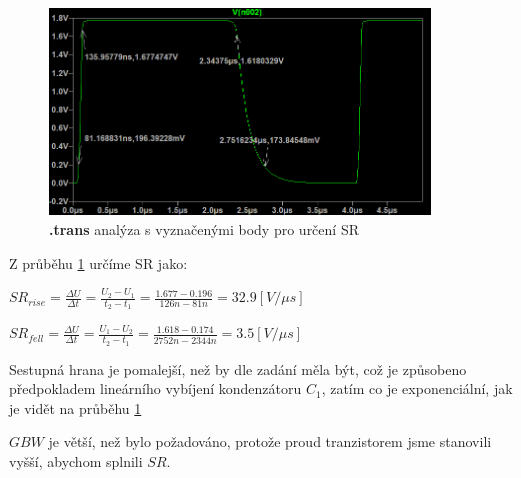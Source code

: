 \vspace{10mm}
\begin{figure}[h!]
    \centering
    \includegraphics[width=0.9\textwidth]{text/img/Res-trans-graf.png}
    \caption{\label{fig:res-SR} {\bf .trans} analýza s vyznačenými body pro určení SR}
\end{figure}

Z průběhu \ref{fig:res-SR} určíme SR jako:
\begin{center}
    \Large
    \(
        SR_{rise} = \frac{\Delta U}{\Delta t} = \frac{U_2 - U_1}{t_2 - t_1} = \frac{1.677 - 0.196}{126n - 81n} = 32.9 [V/\mu s]
    \)

    \(
        SR_{fell} = \frac{\Delta U}{\Delta t} = \frac{U_1 - U_2}{t_2 - t_1} = \frac{1.618 - 0.174}{2752n - 2344n} = 3.5 [V/\mu s]
    \)
\end{center}

Sestupná hrana je pomalejší, než by dle zadání měla být, což je způsobeno předpokladem lineárního vybíjení kondenzátoru \(C_1\), zatím co je exponenciální, jak je vidět na průběhu \ref{fig:res-SR}

\(GBW\) je větší, než bylo požadováno, protože proud tranzistorem jsme stanovili vyšší, abychom splnili \(SR\).